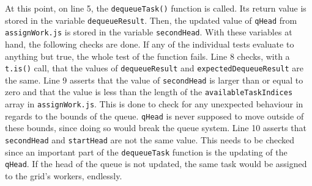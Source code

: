 At this point, on line 5, the \lstinline{dequeueTask()} function is called. Its return value is stored in the variable \lstinline{dequeueResult}. Then, the updated value of \lstinline{qHead} from \lstinline{assignWork.js} is stored in the variable \lstinline{secondHead}. With these variables at hand, the following checks are done. If any of the individual tests evaluate to anything but true, the whole test of the function fails. Line 8 checks, with a \lstinline{t.is()} call, that the values of \lstinline{dequeueResult} and \lstinline{expectedDequeueResult} are the same. Line 9 asserts that the value of \lstinline{secondHead} is larger than or equal to zero and that the value is less than the length of the \lstinline{availableTaskIndices} array in \lstinline{assignWork.js}. This is done to check for any unexpected behaviour in regards to the bounds of the queue. \lstinline{qHead} is never supposed to move outside of these bounds, since doing so would break the queue system. Line 10 asserts that \lstinline{secondHead} and \lstinline{startHead} are not the same value. This needs to be checked since an important part of the \lstinline{dequeueTask} function is the updating of the \lstinline{qHead}. If the head of the queue is not updated, the same task would be assigned to the grid's workers, endlessly. 

